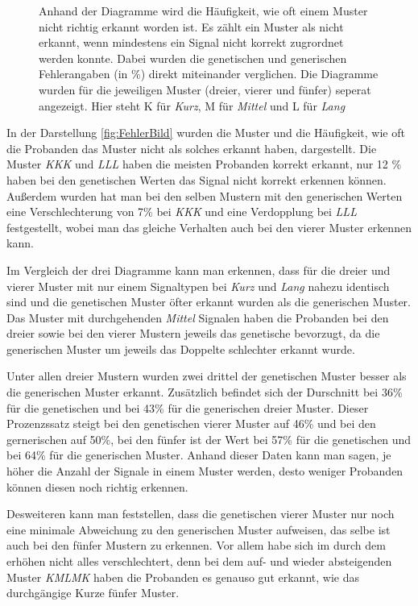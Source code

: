 \begin{figure}[htbp]
\begin{minipage}[t]{0.4\textwidth}
	\end{minipage}
	\caption{Anhand der Diagramme wird die Häufigkeit, wie oft einem Muster nicht richtig erkannt worden ist. Es zählt ein Muster als nicht erkannt, wenn mindestens ein Signal nicht korrekt zugrordnet werden konnte.   
	Dabei wurden die genetischen und generischen Fehlerangaben (in \%) direkt miteinander verglichen. 
	Die Diagramme wurden für die jeweiligen Muster (dreier, vierer und fünfer) seperat angezeigt.
	Hier steht K für \textit{Kurz}, M für \textit{Mittel} und L für \textit{Lang}}
	\label{fig:FehlerBild}
\end{figure}
 
In der Darstellung \autoref{fig:FehlerBild} wurden die Muster und die Häufigkeit, wie oft die Probanden das Muster nicht als solches erkannt haben, dargestellt. 
Die Muster \textit{KKK} und \textit{LLL} haben die meisten Probanden korrekt erkannt, nur 12 \% haben bei den genetischen Werten das Signal nicht korrekt erkennen können. 
Außerdem wurden hat man bei den selben Mustern mit den generischen Werten eine Verschlechterung von 7\% bei \textit{KKK} und eine Verdopplung bei \textit{LLL} festgestellt, wobei man das gleiche Verhalten auch bei den vierer Muster erkennen kann.

Im Vergleich der drei Diagramme kann man erkennen, dass für die dreier und vierer Muster mit nur einem Signaltypen bei \textit{Kurz} und \textit{Lang} nahezu identisch sind und die genetischen Muster öfter erkannt wurden als die generischen Muster. 
Das Muster mit durchgehenden \textit{Mittel} Signalen haben die Probanden bei den dreier sowie bei den vierer Mustern jeweils das genetische bevorzugt, da die generischen Muster um jeweils das Doppelte schlechter erkannt wurde. 

Unter allen dreier Mustern wurden zwei drittel der genetischen Muster besser als die generischen Muster erkannt. 
Zusätzlich befindet sich der Durschnitt bei 36\% für die genetischen und bei 43\% für die generischen dreier Muster.
Dieser Prozenzssatz steigt bei den genetischen vierer Muster auf 46\% und bei den gernerischen auf 50\%, bei den fünfer ist der Wert bei 57\% für die genetischen und bei 64\% für die generischen Muster. 
Anhand dieser Daten kann man sagen, je höher die Anzahl der Signale in einem Muster werden, desto weniger Probanden können diesen noch richtig erkennen.

Desweiteren kann man feststellen, dass die genetischen vierer Muster nur noch eine minimale Abweichung zu den generischen Muster aufweisen, das selbe ist auch bei den fünfer Mustern zu erkennen.
Vor allem habe sich im durch dem erhöhen nicht alles verschlechtert, denn bei dem auf- und wieder absteigenden Muster \textit{KMLMK} haben die Probanden es genauso gut erkannt, wie das durchgängige Kurze fünfer Muster. 

